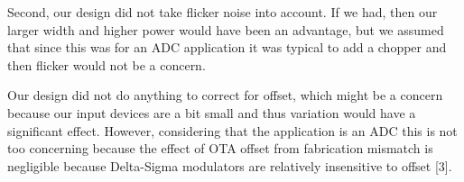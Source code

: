 \documentclass[conference]{IEEEtran}
\begin{document}
Second, our design did not take flicker noise into account. If we had, then our larger width and higher power would have been an advantage, but we assumed that since this was for an ADC application it was typical to add a chopper and then flicker would not be a concern.

Our design did not do anything to correct for offset, which might be a concern because our input devices are a bit small and thus variation would have a significant effect. However, considering that the application is an ADC this is not too concerning because the effect of OTA offset from fabrication mismatch is negligible because Delta-Sigma modulators are relatively insensitive to offset [3].
\end{document}
